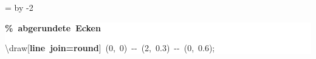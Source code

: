 \begingroup
\ttfamily
{}
=\textwidth
\advance{} by -2\fboxsep
\noindent
\colorbox{background}
{%
\parbox{\dimen255}
{%
\rule[-0.5ex]{0pt}{2.5ex}\hspace*{0.0em}\textcolor{G}{\textbf{\%~abgerundete~Ecken}}\\
\rule[-0.5ex]{0pt}{2.5ex}\hspace*{0.0em}\textbackslash{}draw[\textcolor{R}{\textbf{line~join=round}}]~(0,~0)~{-}{-}~(2,~0.3)~{-}{-}~(0,~0.6);}%
}%
\endgroup

